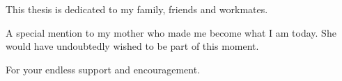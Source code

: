 
\begin{dedication} %

This thesis is dedicated to my family, friends and workmates.

A special mention to my mother who made me become what I am today. She would have undoubtedly wished to be part of this moment. 

For your endless support and encouragement.

\textit{}



\end{dedication}

